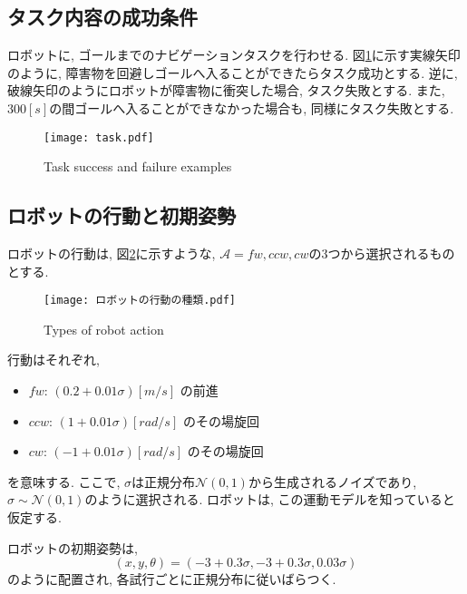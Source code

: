 \subsection{タスク内容の成功条件}
ロボットに, ゴールまでのナビゲーションタスクを行わせる. 
図\ref{fig:task}に示す実線矢印のように, 障害物を回避しゴールへ入ることができたらタスク成功とする. 
逆に, 破線矢印のようにロボットが障害物に衝突した場合, タスク失敗とする. 
また, $300[\si{s}]$の間ゴールへ入ることができなかった場合も, 同様にタスク失敗とする. 

\begin{figure}[H]
  \begin{center}
    \texttt{[image: task.pdf]}
    \caption{Task success and failure examples}
    \label{fig:task}
  \end{center}
\end{figure}

\subsection{ロボットの行動と初期姿勢}
ロボットの行動は, 図\ref{fig:ロボットの行動の種類}に示すような, 
$\mathcal{A} = { fw, ccw, cw }$の3つから選択されるものとする. 

\begin{figure}[H]
  \begin{center}
    \texttt{[image: ロボットの行動の種類.pdf]}
    \caption{Types of robot action}
    \label{fig:ロボットの行動の種類}
  \end{center}
\end{figure}

行動はそれぞれ, 
\begin{itemize}
  \item $fw$: $(0.2 + 0.01\sigma) \si{[m/s]}$ の前進
  \item $ccw$: $(1 + 0.01\sigma) \si{[rad/s]}$ のその場旋回
  \item $cw$: $(-1 + 0.01\sigma) \si{[rad/s]}$ のその場旋回
\end{itemize}
を意味する. 
ここで, $\sigma$は正規分布$\mathcal{N}(0, 1)$から生成されるノイズであり, $\sigma \sim \mathcal{{N}}(0, 1)$のように選択される. 
ロボットは, この運動モデルを知っていると仮定する. 

ロボットの初期姿勢は, 
\begin{equation}
\label{robot initial pose}
  (x, y, \theta) = (-3 + 0.3\sigma, -3 + 0.3\sigma, 0.03\sigma)
\end{equation}
のように配置され, 各試行ごとに正規分布に従いばらつく. 


